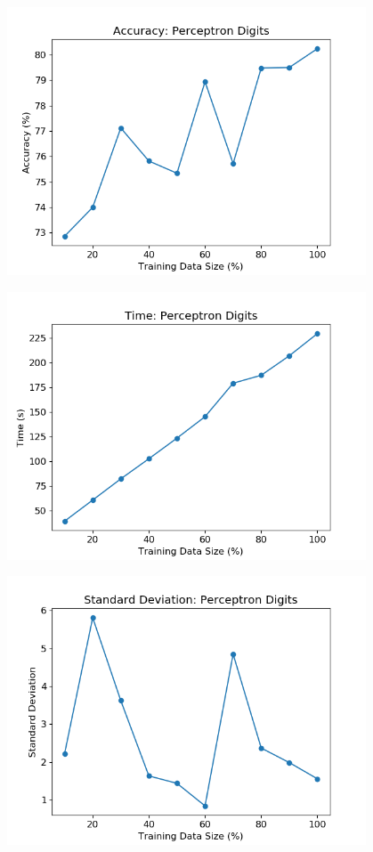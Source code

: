 \documentclass{article}
\begin{document}
\includegraphics[width=0.8\textwidth,height=0.8\textheight,keepaspectratio]{p_d.png}

\includegraphics[width=0.8\textwidth,height=0.8\textheight,keepaspectratio]{p_d-t.png}
 
\includegraphics[width=0.8\textwidth,height=0.8\textheight,keepaspectratio]{std_pd.png}
\end{document}
